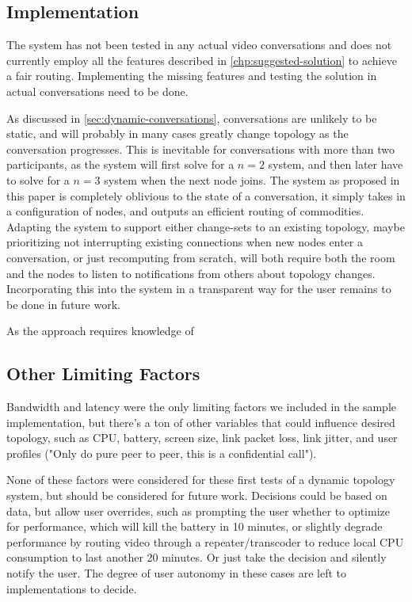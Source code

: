 \subsection{Implementation}

The system has not been tested in any actual video conversations and does not currently employ all the features described in \autoref{chp:suggested-solution} to achieve a fair routing. Implementing the missing features and testing the solution in actual conversations need to be done.

As discussed in \autoref{sec:dynamic-conversations}, conversations are unlikely to be static, and will probably in many cases greatly change topology as the conversation progresses. This is inevitable for conversations with more than two participants, as the system will first solve for a $n=2$ system, and then later have to solve for a $n=3$ system when the next node joins. The system as proposed in this paper is completely oblivious to the state of a conversation, it simply takes in a configuration of nodes, and outputs an efficient routing of commodities. Adapting the system to support either change-sets to an existing topology, maybe prioritizing not interrupting existing connections when new nodes enter a conversation, or just recomputing from scratch, will both require both the room and the nodes to listen to notifications from others about topology changes. Incorporating this into the system in a transparent way for the user remains to be done in future work.

As the approach requires knowledge of


\subsection{Other Limiting Factors}

Bandwidth and latency were the only limiting factors we included in the sample implementation, but there's a ton of other variables that could influence desired topology, such as CPU, battery, screen size, link packet loss, link jitter, and user profiles ("Only do pure peer to peer, this is a confidential call").

None of these factors were considered for these first tests of a dynamic topology system, but should be considered for future work. Decisions could be based on data, but allow user overrides, such as prompting the user whether to optimize for performance, which will kill the battery in 10 minutes, or slightly degrade performance by routing video through a repeater/transcoder to reduce local CPU consumption to last another 20 minutes. Or just take the decision and silently notify the user. The degree of user autonomy in these cases are left to implementations to decide.


